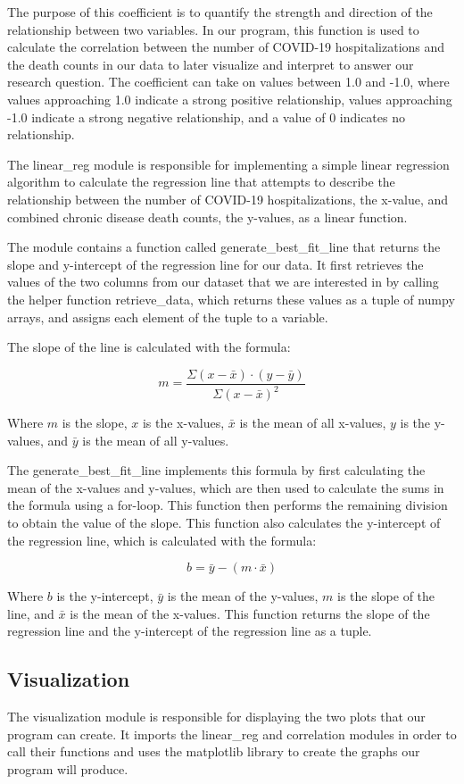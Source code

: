 \documentclass[fontsize=11pt]{article}
\begin{document}
The purpose of this coefficient is to quantify the strength and direction of the relationship between two variables. In our program, this function is used to calculate the correlation between the number of COVID-19 hospitalizations and the death counts in our data to later visualize and interpret to answer our research question. The coefficient can take on values between 1.0 and -1.0, where values approaching 1.0 indicate a strong positive relationship, values approaching -1.0 indicate a strong negative relationship, and a value of 0 indicates no relationship.

\noindent
The linear\_reg module is responsible for implementing a simple linear regression algorithm to calculate the regression line that attempts to describe the relationship between the number of COVID-19 hospitalizations, the x-value, and combined chronic disease death counts, the y-values, as a linear function.

The module contains a function called generate\_best\_fit\_line that returns the slope and y-intercept of the regression line for our data. It first retrieves the values of the two columns from our dataset that we are interested in by calling the helper function retrieve\_data, which returns these values as a tuple of numpy arrays, and assigns each element of the tuple to a variable.

The slope of the line is calculated with the formula:

$$m = \frac{\Sigma (x-\bar{x}) \cdot (y-\bar{y})}{\Sigma(x-\bar{x})^2}$$

Where $m$ is the slope, $x$ is the x-values, $\bar{x}$ is the mean of all x-values, $y$ is the y-values, and $\bar{y}$ is the mean of all y-values.

\noindent
The generate\_best\_fit\_line implements this formula by first calculating the mean of the x-values and y-values, which are then used to calculate the sums in the formula using a for-loop.  This function then performs the remaining division to obtain the value of the slope. This function also calculates the y-intercept of the regression line, which is calculated with the formula:

$$b = \bar{y} - (m \cdot \bar{x})$$

Where $b$ is the y-intercept, $\bar{y}$ is the mean of the y-values, $m$ is the slope of the line, and $\bar{x}$ is the mean of the x-values.
This function returns the slope of the regression line and the y-intercept of the regression line as a tuple. 

\subsection*{Visualization}
The visualization module is responsible for displaying the two plots that our program can create. It imports the linear\_reg and correlation modules in order to call their functions and uses the matplotlib library to create the graphs our program will produce.
\end{document}

